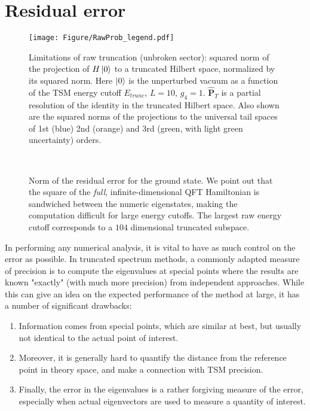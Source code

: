 \documentclass[twocolumn,secnumarabic,amssymb, nobibnotes, aps, prd]{revtex4-2}
\begin{document}
\section{Residual error}
\begin{figure}[h]
\centering
\texttt{[image: Figure/RawProb\_legend.pdf]}
\caption{Limitations of raw truncation (unbroken sector): squared norm of the projection of $H\ket{0}$ to a truncated Hilbert space, normalized by its squared norm. Here $\ket{0}$ is the unperturbed vacuum as a function of the TSM energy cutoff $E_{trunc}$, $L=10$, $g_4=1$. $\hat{\mathbf{P}}_T$ is a partial resolution of the identity in the truncated Hilbert space.  Also shown are the squared norms of the projections to the universal tail spaces of 1st (blue) 2nd (orange) and 3rd (green, with light green uncertainty) orders.}
\label{H2norm0}
\end{figure}
\begin{figure}[h!]
    \centering
    \\

    \caption{Norm of the residual error for the ground state. We point out that the square of the \textit{full}, infinite-dimensional QFT Hamiltonian is sandwiched between the numeric eigenstates, making the computation difficult for large energy cutoffs. The largest raw energy cutoff corresponds to a $104$ dimensional truncated subspace.}
    \label{FigResNorm}
\end{figure}
In performing any numerical analysis, it is vital to have as much control on the error as possible. In truncated spectrum methods, a commonly adapted measure of precision is to compute the eigenvalues at special points where the results are known "exactly" (with much more precision) from independent approaches.  While this can give an idea on the expected performance of the method at large, it has a number of significant drawbacks:
\begin{enumerate}
    \item Information comes from special points, which are similar at best, but usually not identical to the actual point of interest.
    \item Moreover, it is generally hard to quantify the distance from the reference point in theory space, and make a connection with TSM precision.
    \item Finally, the error in the eigenvalues is a rather forgiving measure of the error, especially when actual eigenvectors are used to measure a  quantity of interest. 
\end{enumerate}
\end{document}
